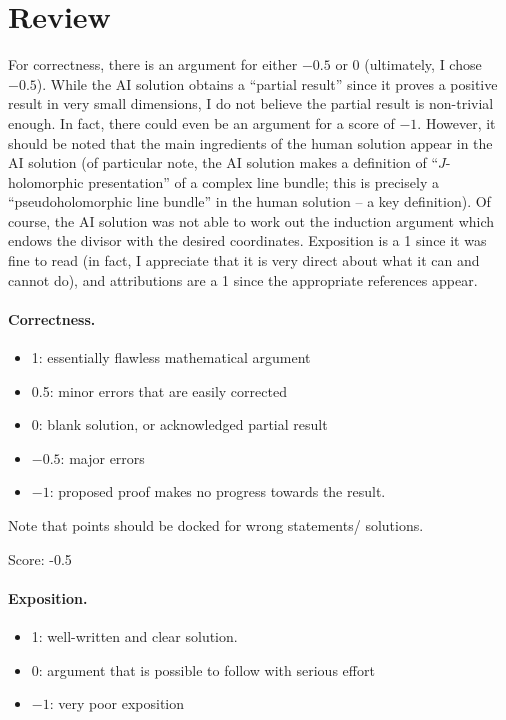 \documentclass[11pt]{article}
\theoremstyle{definition}
\theoremstyle{remark}
\begin{document}
\maketitle

\section{Review}

For correctness, there is an argument for either $-0.5$ or 0 (ultimately, I chose $-0.5$). While the AI solution obtains a ``partial result'' since it proves a positive result in very small dimensions, I do not believe the partial result is non-trivial enough. In fact, there could even be an argument for a score of $-1$. However, it should be noted that the main ingredients of the human solution appear in the AI solution (of particular note, the AI solution makes a definition of ``$J$-holomorphic presentation'' of a complex line bundle; this is precisely a ``pseudoholomorphic line bundle'' in the human solution -- a key definition). Of course, the AI solution was not able to work out the induction argument which endows the divisor with the desired coordinates. Exposition is a 1 since it was fine to read (in fact, I appreciate that it is very direct about what it can and cannot do), and attributions are a 1 since the appropriate references appear.

\paragraph{Correctness.}
\begin{itemize}
	\item  1: essentially flawless mathematical argument
	\item  0.5: minor errors that are easily corrected
	\item  0: blank solution, or acknowledged partial result
	\item  $-0.5$: major errors
	\item  $-1$: proposed proof makes no progress towards the result.
\end{itemize}
Note that points should be docked for wrong statements/ solutions. 

\noindent Score: -0.5

\paragraph{Exposition.}
\begin{itemize}
	\item  1: well-written and clear solution.
	\item  0: argument that is possible to follow with serious effort
	\item  $-1$: very poor exposition
\end{itemize}
\end{document}
